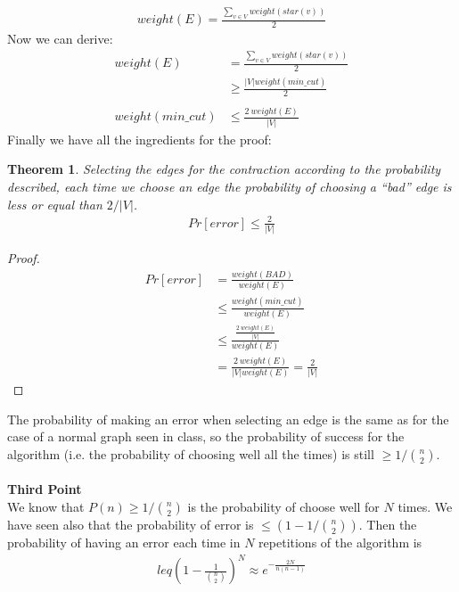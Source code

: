 \documentclass[a4paper]{article}
\newtheorem{theorem}{Theorem}
\begin{document}
\begin{align*}
weight(E) = \frac{\sum_{v \in V} weight(star(v))}{2} \tag{4}
\end{align*}
Now we can derive:
\begin{align*}
weight(E) &= \frac{\sum_{v \in V} weight(star(v))}{2} \tag{from 4}\\
&\geq \frac{\vert V \vert weight(min\_cut)}{2} \tag{from 3}\\ \\
weight(min\_cut) &\leq \frac{2\ weight(E)}{\vert V \vert} \tag{5}
\end{align*}
Finally we have all the ingredients for the proof:
\begin{theorem}
Selecting the edges for the contraction according to the probability described, each time we choose an edge the probability of choosing a ``bad'' edge is less or equal than $2 / \vert V \vert$.
\begin{align*}
Pr[error] \leq \frac{2}{\vert V \vert}
\end{align*}
\end{theorem}
\begin{proof}
\begin{align*}
Pr[error] &= \frac{weight(BAD)}{weight(E)} \tag{from 1}\\
&\leq \frac{weight(min\_cut)}{weight(E)} \tag{from 2}\\
&\leq \frac{\frac{2\ weight(E)}{\vert V \vert}}{weight(E)} \tag{from 5}\\
&= \frac{2\ weight(E)}{\vert V \vert weight(E)} = \frac{2}{\vert V \vert}
\end{align*}
\end{proof}
The probability of making an error when selecting an edge is the same as for the case of a normal graph seen in class, so the probability of success for the algorithm (i.e. the probability of choosing well all the times) is still $\geq 1/ \binom{n}{2}$.
\\
\\
\noindent
\textbf{Third Point}
\\

We know that $P(n) \geq 1 / \binom{n}{2}$ is the probability of choose well for $N$ times.
We have seen also that the probability of error is $\leq (1 - 1/\binom{n}{2})$.
Then the probability of having an error each time in $N$ repetitions of the algorithm is 
\begin{align*}
leq (1 - \frac{1}{\binom{n}{2}})^N \approx e^{-\frac{2N}{n(n-1)}}
\end{align*}
\end{document}
